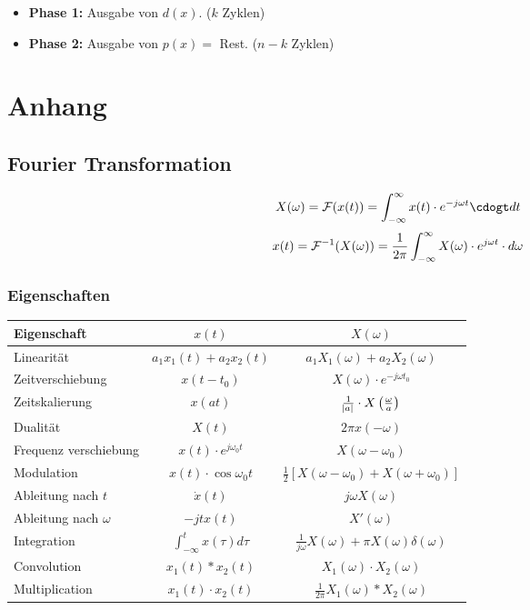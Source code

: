 \documentclass[a4paper]{article}
\begin{document}
\begin{twocolumn}
\begin{itemize}
  \item \textbf{\color{cBlue} Phase 1:} Ausgabe von $d(x)$. ($k$ Zyklen)
  \item \textbf{\color{cRed}  Phase 2:} Ausgabe von $p(x) = $ Rest. ($n-k$ Zyklen)
\end{itemize}

\section{Anhang}

\subsection{Fourier Transformation}
$$X(\omega) = \fourier(x(t)) = \int_{-\infty}^\infty x(t) \cdot e^{-j \omega t} \cdogt dt $$
$$x(t) = \mathcal{F}^{-1}(X(\omega)) = \frac{1}{2\pi} \int_{-\infty}^\infty X(\omega) \cdot e^{j \omega t} \cdot d\omega$$

\subsubsection{Eigenschaften}
\begin{tabular}{lcc}
  Eigenschaft & $x(t)$ & $X(\omega)$ \\
  \toprule
  Linearität & $a_1 x_1(t) + a_2 x_2(t)$ & $a_1 X_1(\omega) + a_2 X_2(\omega)$ \\
  Zeitverschiebung & $x(t-t_0)$ & $X(\omega) \cdot e^{-j \omega t_0}$ \\
  Zeitskalierung & $x(at)$ & $\frac{1}{\abs{a}} \cdot X\left(\frac{\omega}{a}\right)$ \\
  Dualität & $X(t)$ & $2 \pi x(-\omega)$ \\
  Frequenz verschiebung & $x(t) \cdot e^{j \omega_0 t}$ & $X(\omega - \omega_0)$ \\
  Modulation & $x(t) \cdot \cos \omega_0 t$ & $\frac{1}{2} \left[ X(\omega - \omega_0) + X(\omega + \omega_0) \right]$ \\
  Ableitung nach $t$ & $\dot{x}(t)$ & $j \omega X(\omega)$ \\
  Ableitung nach $\omega$ & $-j t x(t)$ & $X'(\omega)$ \\
  Integration & $\int_{-\infty}^t x(\tau) d\tau$ & $\frac{1}{j\omega} X(\omega) + \pi X(\omega) \delta(\omega)$  \\
  Convolution & $x_1(t) \ast x_2(t)$ & $X_1(\omega) \cdot X_2(\omega)$ \\
  Multiplication & $x_1(t) \cdot x_2(t)$ & $\frac{1}{2\pi} X_1(\omega) \ast X_2(\omega)$ 
\end{tabular}


\end{twocolumn}
\end{document}

